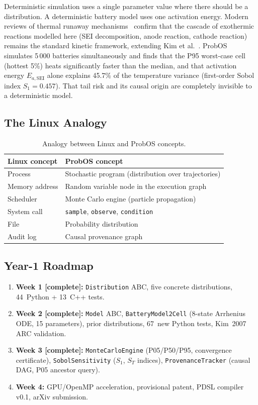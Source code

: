 \documentclass[12pt,a4paper]{article}
\theoremstyle{plain}
\theoremstyle{definition}
\theoremstyle{remark}
\begin{document}
Deterministic simulation uses a single parameter value where there should
be a distribution.
A deterministic battery model uses one activation energy. Modern reviews of thermal runaway mechanisms~\citep{feng2018,wang2021} confirm that the cascade of exothermic reactions modelled here (SEI decomposition, anode reaction, cathode reaction) remains the standard kinetic framework, extending Kim et al.~\citep{kim2007}.
ProbOS simulates 5\,000 batteries simultaneously and finds that the P95
worst-case cell (hottest 5\%) heats significantly faster than the median,
and that activation energy $E_{a,\text{SEI}}$ alone explains 45.7\% of
the temperature variance (first-order Sobol index $S_1 = 0.457$).
That tail risk and its causal origin are completely invisible to a
deterministic model.

\subsection{The Linux Analogy}

\begin{table}[h]
\centering
\caption{Analogy between Linux and ProbOS concepts.}
\label{tab:analogy}
\begin{tabular}{ll}
\toprule
\textbf{Linux concept} & \textbf{ProbOS concept} \\
\midrule
Process & Stochastic program (distribution over trajectories) \\
Memory address & Random variable node in the execution graph \\
Scheduler & Monte Carlo engine (particle propagation) \\
System call & \texttt{sample}, \texttt{observe}, \texttt{condition} \\
File & Probability distribution \\
Audit log & Causal provenance graph \\
\bottomrule
\end{tabular}
\end{table}

\subsection{Year-1 Roadmap}

\begin{enumerate}[leftmargin=2em]
  \item \textbf{Week 1 [complete]:} \texttt{Distribution} ABC,
    five concrete distributions, 44~Python + 13~C++ tests.
  \item \textbf{Week 2 [complete]:} \texttt{Model} ABC,
    \texttt{BatteryModel2Cell} (8-state Arrhenius ODE, 15 parameters),
    prior distributions, 67~new Python tests, Kim~2007 ARC validation.
  \item \textbf{Week 3 [complete]:} \texttt{MonteCarloEngine}
    (P05/P50/P95, convergence certificate),
    \texttt{SobolSensitivity} ($S_1$, $S_T$ indices),
    \texttt{ProvenanceTracker} (causal DAG, P05 ancestor query).
  \item \textbf{Week 4:} GPU/OpenMP acceleration, provisional patent,
    PDSL compiler v0.1, arXiv submission.
\end{enumerate}
\end{document}
